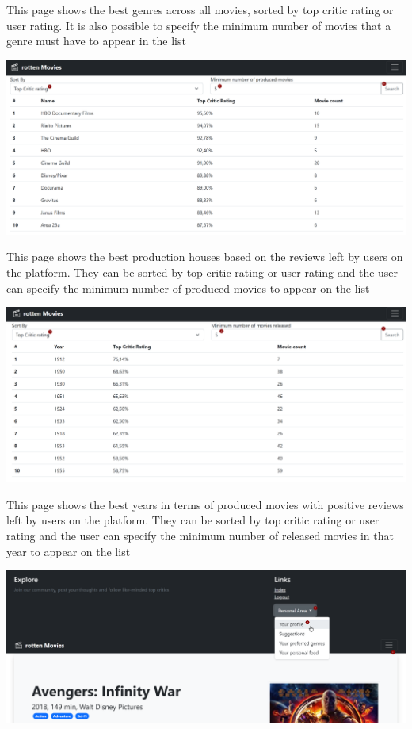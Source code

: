 This page shows the best genres across all movies, sorted by top critic rating or user rating. It is also possible to specify the minimum number of movies that a genre must have to appear in the list

\begin{center}
\includegraphics[scale=0.45]{../../../images/user_manual/best_production_houses.png}
\end{center}
\vspace{5pt}

This page shows the best production houses based on the reviews left by users on the platform. They can be sorted by top critic rating or user rating and the user can specify the minimum number of produced movies to appear on the list

\begin{center}
\includegraphics[scale=0.45]{../../../images/user_manual/best_years.png} 
\end{center}


This page shows the best years in terms of produced movies with positive reviews left by users on the platform. They can be sorted by top critic rating or user rating and the user can specify the minimum number of released movies in that year to appear on the list

\begin{center}
\includegraphics[scale=0.45]{../../../images/user_manual/authenticated_navbar.png} 
\end{center}
\vspace{5pt}

